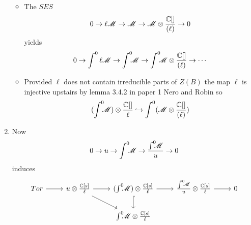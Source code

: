 \begin{enumerate}
\begin{itemize}
    \item The $SES$
    $$ 0 \to \ell \mathscr{M} \to \mathscr{M} \to \mathscr{M} \otimes \frac{\mathbb{C}[]}{(\ell)} \to 0$$
    yields
    $$0 \to \int^0  \ell \mathscr{M} \to \int^0 \mkern -8mu \mathscr{M} \to \int^0 \mkern -8mu \mathscr{M} \otimes \frac{\mathbb{C}[]}{(\ell)}\to \cdots$$
    \item Provided $\ell$ does not contain irreducible parts of $Z(B)$ the map $\ell$ is injective upstairs by lemma 3.4.2 in paper 1 Nero and Robin so
    $$(\int^0 \mkern -8mu \mathscr{M} )\otimes \frac{\mathbb{C}[]}{\ell} \hookrightarrow \int^0 (\mathscr{M} \otimes \frac{\mathbb{C}[]}{(\ell)}) $$
  \end{itemize}
  \item Now
  $$0 \to u \to \int^0 \mkern -8mu \mathscr{M} \to \frac{\int^0 \mkern -8mu \mathscr{M}}{u} \to 0 $$
  induces
  $$\begin{tikzcd}
    Tor\arrow{r} & u\otimes \frac{\C[s]}{\ell}\arrow{r}\arrow{rd} & (\Int \M) \otimes \frac{\C[s]}{\ell}\arrow{r}\arrow[hookrightarrow]{d} & \frac{\Int \M}{u} \otimes \frac{\C[s]}{\ell}\arrow{r} & 0\\
    & & \Int \M \otimes \frac{\C[s]}{\ell}
  \end{tikzcd} $$
  \end{enumerate}
